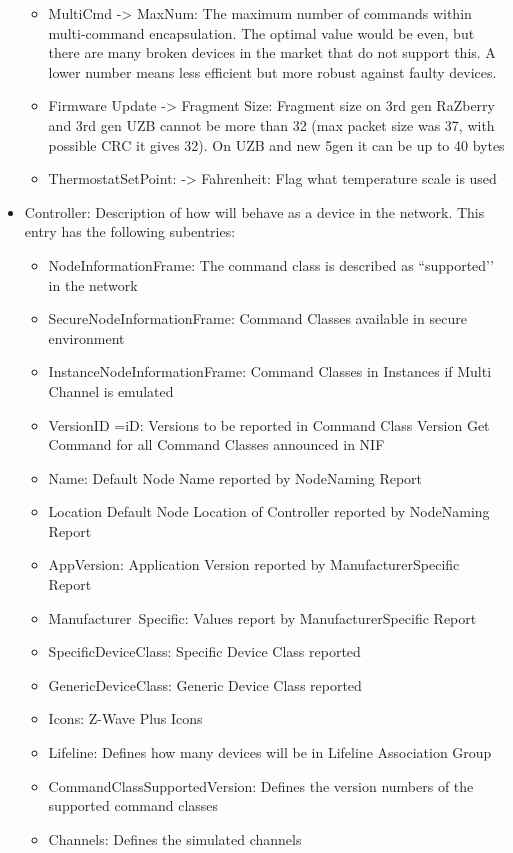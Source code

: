 \begin{itemize}
\begin{itemize}
\item MultiCmd -> MaxNum: The maximum number of commands within multi-command encapsulation. 
The optimal value would be even, but there are many broken devices in the market that do 
not support this. A lower number means less efficient but more robust against faulty devices.
\item Firmware Update -> Fragment Size: Fragment size on 3rd gen RaZberry and 3rd gen UZB 
cannot be more than 32 (max packet size was 37, with possible CRC it gives 32). On UZB 
and new 5gen it can be up to 40 bytes
\item ThermostatSetPoint: -> Fahrenheit: Flag what temperature scale is used
\end{itemize}

\item Controller: Description of how \zway will behave as a device in the network. This entry has the following subentries:

\begin{itemize}
\item NodeInformationFrame: The command class \zway is described as ``supported’’ in the network
\item SecureNodeInformationFrame: Command Classes available in secure environment
\item InstanceNodeInformationFrame: Command Classes in Instances if Multi Channel is emulated
\item VersionID =iD: Versions to be reported in Command Class Version Get Command for all Command Classes announced in NIF
\item Name: Default Node Name reported by NodeNaming Report
\item Location Default Node Location of Controller reported by NodeNaming Report
\item AppVersion: Application Version reported by ManufacturerSpecific Report
\item Manufacturer\ Specific: Values report by ManufacturerSpecific Report
\item SpecificDeviceClass: Specific Device Class reported
\item GenericDeviceClass: Generic Device Class reported
\item Icons: Z-Wave Plus Icons
\item Lifeline: Defines how many devices will be in Lifeline Association Group
\item CommandClassSupportedVersion: Defines the version numbers of the supported command classes
\item Channels: Defines the simulated channels
\end{itemize}

\end{itemize}

